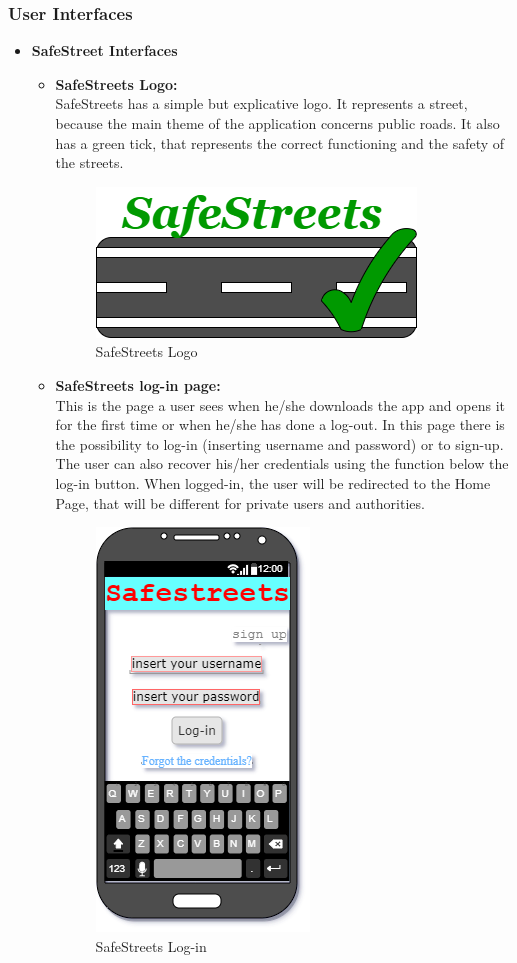 \documentclass[titlepage]{article}
\begin{document}
\subsubsection{User Interfaces}
\begin{itemize}
	\item\textbf{SafeStreet Interfaces}
	\begin{itemize}
		\item \textbf{SafeStreets Logo:}\\
		SafeStreets has a simple but explicative logo. It represents a street, because the main theme of the application concerns public roads. It also has a green tick, that represents the correct functioning and the safety of the streets.\\ 
		
	\begin{figure}[h]
	\includegraphics[scale=0.8]{Mockups/LogoSafeStreets.png}
	\centering
	\caption{SafeStreets Logo}
\end{figure}
\FloatBarrier


	\newpage
	
	\item \textbf{SafeStreets log-in page:}\\
	This is the page a user sees when he/she downloads the app and opens it for the first time or when he/she has done a log-out. In this page there is the possibility to log-in (inserting username and password) or to sign-up. The user can also recover his/her credentials using the function below the log-in button. When logged-in, the user will be redirected to the Home Page, that will be different for private users and authorities.
	\begin{figure}[h]
	\includegraphics[scale=0.7]{Mockups/log in.png}
	\centering
	\caption{SafeStreets Log-in}
	\end{figure}
	\FloatBarrier
	

\end{itemize}
\end{itemize}
\end{document}
